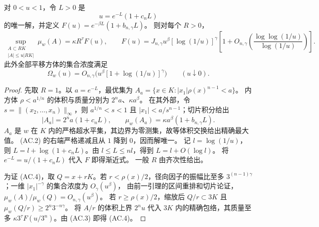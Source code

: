 \begin{lemma}[临界权的局部精确包络]\label{lem:critical-local}
对 $0<u<1$，令 $L>0$ 是
\[
 u=e^{-L}(1+c_nL) \tag{AC.2}
\]
的唯一解，并定义 $F(u)=e^{-\beta L}(1+b_{n,\gamma}L)$。
则对每个 $R>0$，
\[
 \sup_{\substack{A\subset RK\\|A|\le u|RK|}}\mu_w(A)
 =\kappa R^\tau F(u),\qquad
 F(u)=J_{n,\gamma}u^\beta[\log(1/u)]^\gamma
 \left[1+O_{n,\gamma}\!\left(\frac{\log\log(1/u)}{\log(1/u)}\right)\right]. \tag{AC.3}
\]
此外全部平移方体的集合浓度满足
\[
 \Omega_w(u)=O_{n,\gamma}\bigl(u^\beta[1+\log(1/u)]^\gamma\bigr)
 \qquad(u\downarrow0). \tag{AC.4}
\]
\end{lemma}
\begin{proof}
先取 $R=1$。以 $a=e^{-L}$，最优集为
$A_a=\{x\in K:|x_1|\rho(x)^{n-1}<a\}$。
内方体 $\rho<a^{1/n}$ 的体积与质量分别为 $2^na$、$\kappa a^\beta$。
在其外部，令 $s=\|(x_2,\ldots,x_n)\|_\infty$，则
$a^{1/n}<s<1$ 且 $|x_1|<a/s^{n-1}$；切片积分给出
\[
 |A_a|=2^na(1+c_nL),\qquad
 \mu_w(A_a)=\kappa a^\beta(1+b_{n,\gamma}L). \tag{AC.5}
\]
$A_a$ 是 $w$ 在 $K$ 内的严格超水平集，其边界为零测集，故等体积交换给出精确最大值。
(AC.2) 的右端严格递减且从 $1$ 降到 $0$，因而解唯一。
记 $l=\log(1/u)$，则 $L=l+\log(1+c_nL)$。由 $l\le L\le nl$，得到 $L=l+O(\log l)$。
将 $e^{-L}=u/(1+c_nL)$ 代入 $F$ 即得渐近式。
一般 $R$ 由齐次性给出。

为证 (AC.4)，取 $Q=x+rK$。若 $r<\rho(x)/2$，径向因子的振幅比至多
$3^{(n-1)\gamma}$；一维 $|x_1|^{-\gamma}$ 的集合浓度为 $O_\gamma(u^\beta)$，
由前一引理的区间重排和切片论证，$\mu_w(A)/\mu_w(Q)=O_{n,\gamma}(u^\beta)$。
若 $r\ge\rho(x)/2$，缩放后 $Q/r\subset3K$ 且
$\mu_w(Q/r)\ge2^n3^{-n\gamma}$。
将 $A/r$ 的体积上界 $2^nu$ 代入 $3K$ 内的精确包络，其质量至多
$\kappa3^\tau F(u/3^n)$。由 (AC.3) 即得 (AC.4)。
\end{proof}

